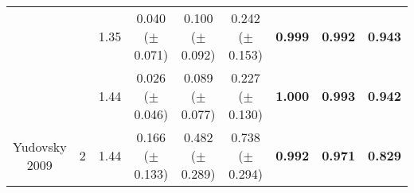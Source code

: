 \begin{table}[bhp]
\begin{tabular}{|cc|c|ccc|ccc|}
        & & 1.35 & \shortstack{0.040 \\($\pm$ 0.071)} & \shortstack{0.100 \\($\pm$ 0.092)} & \shortstack{0.242 \\($\pm$ 0.153)} & \textbf{0.999} & \textbf{0.992} & \textbf{0.943} \\
        & & 1.44 & \shortstack{0.026 \\($\pm$ 0.046)} & \shortstack{0.089 \\($\pm$ 0.077)} & \shortstack{0.227 \\($\pm$ 0.130)} & \textbf{1.000} & \textbf{0.993} & \textbf{0.942} \\
        \hline
        \shortstack{Yudovsky\\ 2009} & 2 & 1.44 & \shortstack{0.166 \\($\pm$ 0.133)} & \shortstack{0.482 \\($\pm$ 0.289)} & \shortstack{0.738 \\($\pm$ 0.294)} & \textbf{0.992} & \textbf{0.971} & \textbf{0.829} \\
        \hline
    \end{tabular}
    \label{ap:forwardsHSIMCq}
\end{table}
\FloatBarrier

